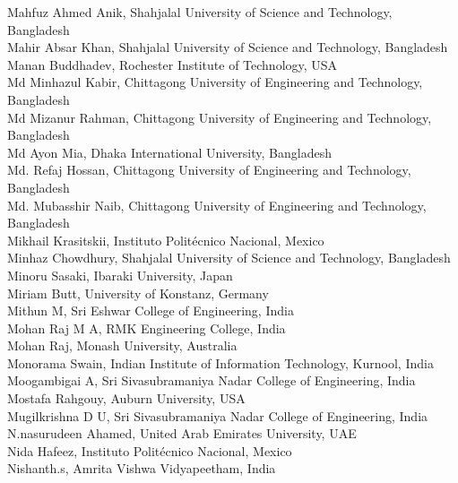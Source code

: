 \documentclass[11pt,oneside]{book}
\begin{document}
\begin{description}
              Mahfuz Ahmed Anik, Shahjalal University of Science and Technology, Bangladesh\\
              Mahir Absar Khan, Shahjalal University of Science and Technology, Bangladesh\\
              Manan Buddhadev, Rochester Institute of Technology, USA\\
              Md Minhazul Kabir, Chittagong University of Engineering and Technology, Bangladesh\\
              Md Mizanur Rahman, Chittagong University of Engineering and Technology, Bangladesh\\
              Md Ayon Mia, Dhaka International University, Bangladesh\\
              Md. Refaj Hossan, Chittagong University of Engineering and Technology, Bangladesh\\
              Md. Mubasshir Naib, Chittagong University of Engineering and Technology, Bangladesh\\
              Mikhail Krasitskii, Instituto Politécnico Nacional, Mexico\\
              Minhaz Chowdhury, Shahjalal University of Science and Technology, Bangladesh\\
              Minoru Sasaki, Ibaraki University, Japan\\
              Miriam Butt, University of Konstanz, Germany\\
              Mithun M, Sri Eshwar College of Engineering, India\\
              Mohan Raj M A, RMK Engineering College, India\\
              Mohan Raj, Monash University, Australia\\
              Monorama Swain, Indian Institute of Information Technology, Kurnool, India\\
              Moogambigai A, Sri Sivasubramaniya Nadar College of Engineering, India\\
              Mostafa Rahgouy, Auburn University, USA\\
              Mugilkrishna D U, Sri Sivasubramaniya Nadar College of Engineering, India\\
              N.nasurudeen Ahamed, United Arab Emirates University, UAE\\
              Nida Hafeez, Instituto Politécnico Nacional, Mexico\\
              Nishanth.s, Amrita Vishwa Vidyapeetham, India\\

\end{description}
\end{document}
